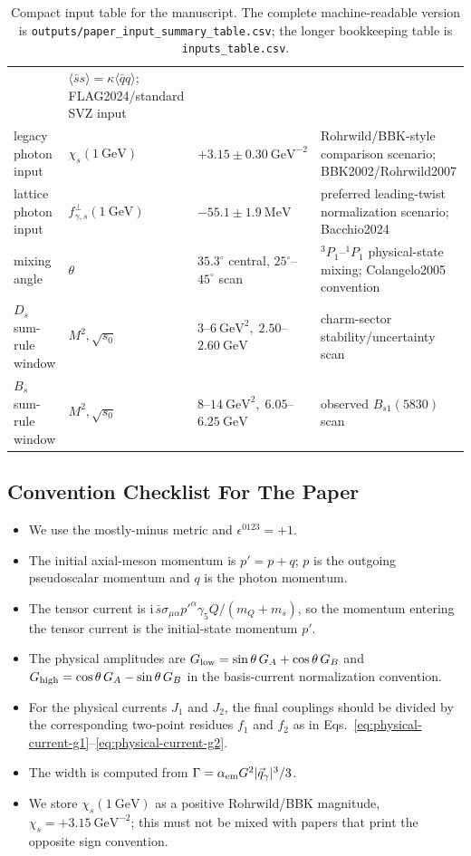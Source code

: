 \documentclass[11pt]{article}
\newcommand{\Bsone}{B_{s1}}
\newcommand{\GeV}{\mathrm{GeV}}
\newcommand{\ii}{\mathrm{i}}
\begin{document}
\begin{table}[htbp]
{\begin{tabular}{llll}
      & $\langle\bar s s\rangle=\kappa\langle\bar q q\rangle$; FLAG2024/standard SVZ input\\
    legacy photon input
      & $\chi_s(1~\GeV)$
      & $+3.15\pm0.30~\GeV^{-2}$
      & Rohrwild/BBK-style comparison scenario; BBK2002/Rohrwild2007\\
    lattice photon input
      & $f_{\gamma,s}^{\perp}(1~\GeV)$
      & $-55.1\pm1.9~\mathrm{MeV}$
      & preferred leading-twist normalization scenario; Bacchio2024\\
    mixing angle
      & $\theta$
      & $35.3^\circ$ central, $25^\circ$--$45^\circ$ scan
      & ${}^3P_1$--${}^1P_1$ physical-state mixing; Colangelo2005 convention\\
    $D_s$ sum-rule window
      & $M^2,\sqrt{s_0}$
      & $3$--$6~\GeV^2,\;2.50$--$2.60~\GeV$
      & charm-sector stability/uncertainty scan\\
    $B_s$ sum-rule window
      & $M^2,\sqrt{s_0}$
      & $8$--$14~\GeV^2,\;6.05$--$6.25~\GeV$
      & observed $\Bsone(5830)$ scan\\
    \bottomrule
  \end{tabular}%
  }
  \caption{Compact input table for the manuscript.  The complete
  machine-readable version is \texttt{outputs/paper\_input\_summary\_table.csv};
  the longer bookkeeping table is \texttt{inputs\_table.csv}.}
  \label{tab:paper-input-summary}
\end{table}

\subsection{Convention Checklist For The Paper}

\begin{itemize}
  \item We use the mostly-minus metric and $\epsilon^{0123}=+1$.
  \item The initial axial-meson momentum is $p'=p+q$; $p$ is the outgoing
  pseudoscalar momentum and $q$ is the photon momentum.
  \item The tensor current is
  $\ii\,\bar s\sigma_{\mu\alpha}p'^\alpha\gamma_5 Q/(m_Q+m_s)$, so the
  momentum entering the tensor current is the initial-state momentum $p'$.
  \item The physical amplitudes are
  $G_{\rm low}=\sin\theta\,G_A+\cos\theta\,G_B$ and
  $G_{\rm high}=\cos\theta\,G_A-\sin\theta\,G_B$ in the basis-current
  normalization convention.
  \item For the physical currents $J_1$ and $J_2$, the final couplings should
  be divided by the corresponding two-point residues $f_1$ and $f_2$ as in
  Eqs.~\eqref{eq:physical-current-g1}--\eqref{eq:physical-current-g2}.
  \item The width is computed from
  $\Gamma=\alpha_{\rm em}G^2|\vec q_\gamma|^3/3$.
  \item We store $\chi_s(1~\GeV)$ as a positive Rohrwild/BBK magnitude,
  $\chi_s=+3.15~\GeV^{-2}$; this must not be mixed with papers that print the
  opposite sign convention.
\end{itemize}
\end{document}
